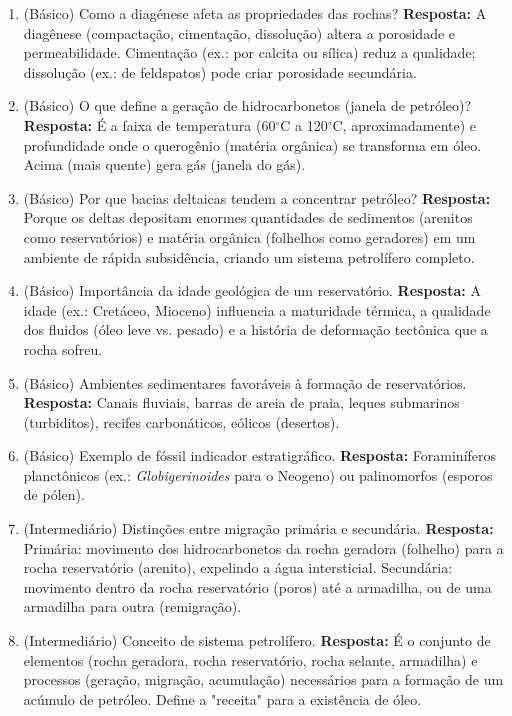 \documentclass[11pt,a4paper]{article}
\begin{document}
\begin{enumerate}
  \item (Básico) Como a diagénese afeta as propriedades das rochas?
  \textbf{Resposta:} A diagênese (compactação, cimentação, dissolução) altera a porosidade e permeabilidade. Cimentação (ex.: por calcita ou sílica) reduz a qualidade; dissolução (ex.: de feldspatos) pode criar porosidade secundária.

  \item (Básico) O que define a geração de hidrocarbonetos (janela de petróleo)?
  \textbf{Resposta:} É a faixa de temperatura (60$^\circ$C a 120$^\circ$C, aproximadamente) e profundidade onde o querogênio (matéria orgânica) se transforma em óleo. Acima (mais quente) gera gás (janela do gás).

  \item (Básico) Por que bacias deltaicas tendem a concentrar petróleo?
  \textbf{Resposta:} Porque os deltas depositam enormes quantidades de sedimentos (arenitos como reservatórios) e matéria orgânica (folhelhos como geradores) em um ambiente de rápida subsidência, criando um sistema petrolífero completo.

  \item (Básico) Importância da idade geológica de um reservatório.
  \textbf{Resposta:} A idade (ex.: Cretáceo, Mioceno) influencia a maturidade térmica, a qualidade dos fluidos (óleo leve vs. pesado) e a história de deformação tectônica que a rocha sofreu.

  \item (Básico) Ambientes sedimentares favoráveis à formação de reservatórios.
  \textbf{Resposta:} Canais fluviais, barras de areia de praia, leques submarinos (turbiditos), recifes carbonáticos, eólicos (desertos).

  \item (Básico) Exemplo de fóssil indicador estratigráfico.
  \textbf{Resposta:} Foraminíferos planctônicos (ex.: \textit{Globigerinoides} para o Neogeno) ou palinomorfos (esporos de pólen).

  \item (Intermediário) Distinções entre migração primária e secundária.
  \textbf{Resposta:} Primária: movimento dos hidrocarbonetos da rocha geradora (folhelho) para a rocha reservatório (arenito), expelindo a água intersticial. Secundária: movimento dentro da rocha reservatório (poros) até a armadilha, ou de uma armadilha para outra (remigração).

  \item (Intermediário) Conceito de sistema petrolífero.
  \textbf{Resposta:} É o conjunto de elementos (rocha geradora, rocha reservatório, rocha selante, armadilha) e processos (geração, migração, acumulação) necessários para a formação de um acúmulo de petróleo. Define a "receita" para a existência de óleo.


\end{enumerate}
\end{document}
